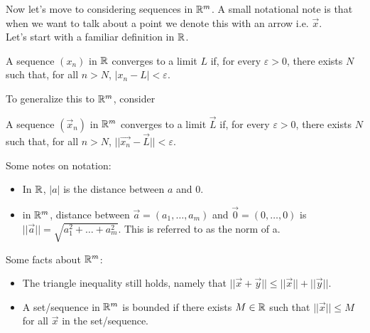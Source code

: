 Now let's move to considering sequences in $\mathbb{R}^m$. A small notational note is that when we want to talk about a point we denote this with an arrow i.e. $\vec{x}$. \\

Let's start with a familiar definition in $\mathbb{R}$. \begin{definition}
A sequence $(x_n)$ in $\mathbb{R}$ converges to a limit $L$ if, for every $\varepsilon > 0$, there exists $N$ such that, for all $n > N$, $|x_n - L| < \varepsilon$. 
\end{definition}
To generalize this to $\mathbb{R}^m$, consider
\begin{definition}
A sequence $(\vec{x}_n)$ in $\mathbb{R}^m$ converges to a limit $\vec{L}$ if, for every $\varepsilon > 0$, there exists $N$ such that, for all $n > N$, $||\vec{x_n} - \vec{L}|| < \varepsilon$.
\end{definition}
Some notes on notation:
\begin{itemize}
    \item In $\mathbb{R}$, $|a|$ is the distance between $a$ and $0$.
    \item in $\mathbb{R}^m$, distance between $\vec{a} = (a_1, \dots, a_m)$ and $\vec{0} = (0, \dots, 0)$ is $||\vec{a}|| = \sqrt{a_1^2 + \dots + a_m^2}$. This is referred to as the norm of a. 
\end{itemize}
Some facts about $\mathbb{R}^m$:
\begin{itemize}
    \item The triangle inequality still holds, namely that $||\vec{x} + \vec{y}|| \le ||\vec{x}|| + ||\vec{y}||$.
    \item A set/sequence in $\mathbb{R}^m$ is bounded if there exists $M \in \mathbb{R}$ such that $||\vec{x}|| \leq M$ for all $\vec{x}$ in the set/sequence.
\end{itemize}